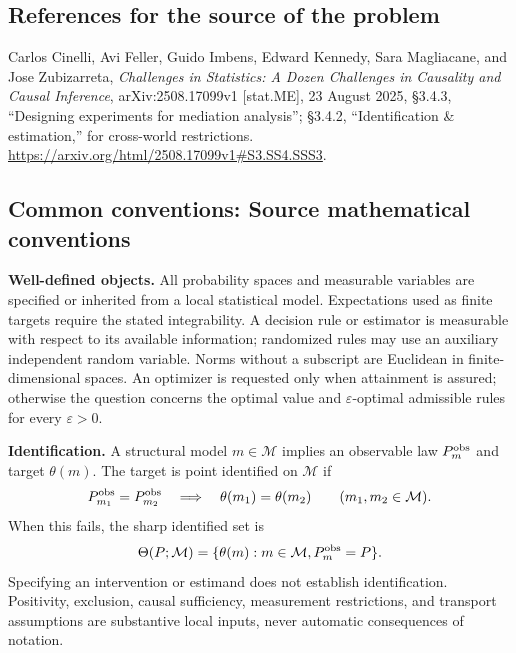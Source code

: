 \documentclass[11pt,a4paper]{article}
\begin{document}
\subsection*{References for the source of the problem}
Carlos Cinelli, Avi Feller, Guido Imbens, Edward Kennedy, Sara Magliacane, and Jose Zubizarreta, \emph{Challenges in Statistics: A Dozen Challenges in Causality and Causal Inference}, arXiv:2508.17099v1 [stat.ME], 23 August 2025, \S3.4.3, ``Designing experiments for mediation analysis''; \S3.4.2, ``Identification \& estimation,'' for cross-world restrictions. \url{https://arxiv.org/html/2508.17099v1#S3.SS4.SSS3}.

\subsection*{Common conventions: Source mathematical conventions}

\textbf{Well-defined objects.}
All probability spaces and measurable variables are specified or inherited
from a local statistical model. Expectations used as finite targets require
the stated integrability. A decision rule or estimator is measurable with
respect to its available information; randomized rules may use an auxiliary
independent random variable. Norms without a subscript are Euclidean in
finite-dimensional spaces. An optimizer is requested only when attainment
is assured; otherwise the question concerns the optimal value and
$\varepsilon$-optimal admissible rules for every $\varepsilon>0$.

\textbf{Identification.}
A structural model $m\in\mathcal M$ implies an observable law
$P_m^{\rm obs}$ and target $\theta(m)$. The target is point identified on
$\mathcal M$ if
\[
 P_{m_1}^{\rm obs}=P_{m_2}^{\rm obs}
 \quad\Longrightarrow\quad\theta(m_1)=\theta(m_2)
 \qquad(m_1,m_2\in\mathcal M).
\]
When this fails, the sharp identified set is
\[
 \Theta(P;\mathcal M)=\{\theta(m):m\in\mathcal M,
                                  P_m^{\rm obs}=P\}.
\]
Specifying an intervention or estimand does not establish identification.
Positivity, exclusion, causal sufficiency, measurement restrictions, and
transport assumptions are substantive local inputs, never automatic
consequences of notation.
\end{document}
